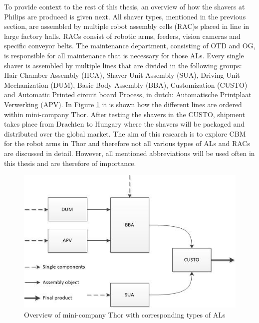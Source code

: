 To provide context to the rest of this thesis, an overview of how the shavers at Philips are produced is given next. All shaver types, mentioned in the previous section, are assembled by multiple robot assembly cells (RAC)s placed in line in large factory halls. RACs consist of robotic arms, feeders, vision cameras and specific conveyor belts. The maintenance department, consisting of OTD and OG, is responsible for all maintenance that is necessary for those ALs. Every single shaver is assembled by multiple lines that are divided in the following groups: Hair Chamber Assembly (HCA), Shaver Unit Assembly (SUA), Driving Unit Mechanization (DUM), Basic Body Assembly (BBA), Customization (CUSTO) and Automatic Printed circuit board Process, in dutch: Automatische Printplaat Verwerking (APV). In Figure \ref{fig:assemblyline} it is shown how the different lines are ordered within mini-company Thor. After testing the shavers in the CUSTO, shipment takes place from Drachten to Hungary where the shavers will be packaged and distributed over the global market. The aim of this research is to explore CBM for the robot arms in Thor and therefore not all various types of ALs and RACs are discussed in detail. However, all mentioned abbreviations will be used often in this thesis and are therefore of importance.
\begin{figure}[ht]
\centering
\includegraphics[width=\textwidth]{Figures/assemblyline_Thor}
\caption[Overview of mini-company Thor with corresponding types of ALs]{Overview of mini-company Thor with corresponding types of ALs}
\label{fig:assemblyline}
\end{figure}

